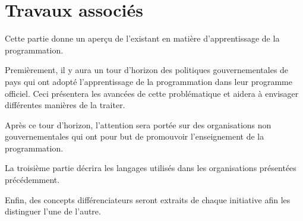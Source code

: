 \chapter{Travaux associés}
\label{travail associé}
Cette partie donne un aperçu de l'existant en matière d'apprentissage de la programmation.

Premièrement, il y aura un tour d'horizon des politiques gouvernementales de pays qui ont adopté l'apprentissage de la programmation dans leur programme officiel. Ceci présentera les avancées de cette problématique et aidera à envisager différentes manières de la traiter.

Après ce tour d'horizon, l'attention sera portée sur des organisations non gouvernementales qui ont pour but de promouvoir l'enseignement de la programmation. 

La troisième partie décrira les langages utilisés dans les organisations présentées précédemment. 

Enfin, des concepts différenciateurs seront extraits de chaque initiative afin les distinguer l'une de l'autre.




